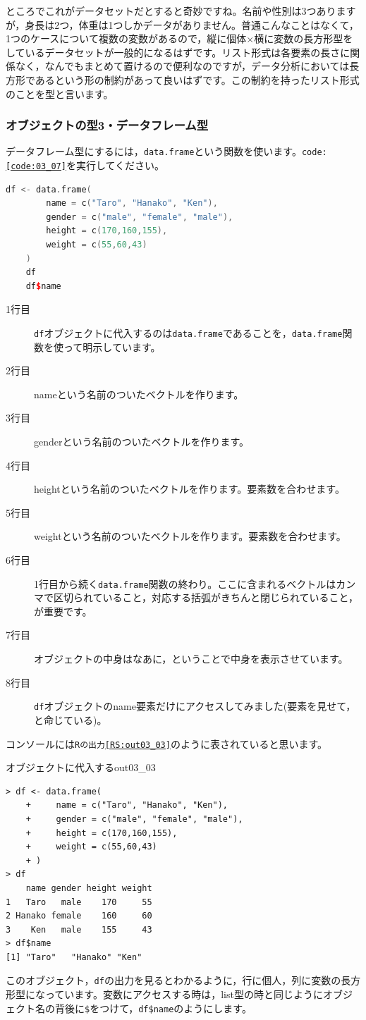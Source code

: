 \documentclass{ltjsbook}
\begin{document}
ところでこれがデータセットだとすると奇妙ですね。名前や性別は3つありますが，身長は2つ，体重は1つしかデータがありません。普通こんなことはなくて，1つのケースについて複数の変数があるので，縦に個体$\times$横に変数の長方形型をしているデータセットが一般的になるはずです。リスト形式は各要素の長さに関係なく，なんでもまとめて置けるので便利なのですが，データ分析においては長方形であるという形の制約があって良いはずです。この制約を持ったリスト形式のことを型と言います。
\subsubsection{オブジェクトの型3・データフレーム型}
データフレーム型にするには，\texttt{data.frame}という関数を使います。\texttt{code:\ref{code:03_07}}を実行してください。
\begin{lstlisting}[language=c++,label={code:03_07},caption={データフレーム型}]
	df <- data.frame(
		name = c("Taro", "Hanako", "Ken"),
		gender = c("male", "female", "male"),
		height = c(170,160,155),
		weight = c(55,60,43)
	)
	df
	df$name
\end{lstlisting}
\begin{description}
	\item[1行目] \texttt{df}オブジェクトに代入するのは\texttt{data.frame}であることを，\texttt{data.frame}関数を使って明示しています。
	\item[2行目] nameという名前のついたベクトルを作ります。
	\item[3行目] genderという名前のついたベクトルを作ります。
	\item[4行目] heightという名前のついたベクトルを作ります。要素数を合わせます。
	\item[5行目] weightという名前のついたベクトルを作ります。要素数を合わせます。
	\item[6行目] 1行目から続く\texttt{data.frame}関数の終わり。ここに含まれるベクトルはカンマで区切られていること，対応する括弧がきちんと閉じられていること，が重要です。
	\item[7行目] オブジェクトの中身はなあに，ということで中身を表示させています。
	\item[8行目] \texttt{df}オブジェクトのname要素だけにアクセスしてみました(要素を見せて，と命じている)。
\end{description}
コンソールには\texttt{Rの出力\ref{RS:out03_03}}のように表されていると思います。
\begin{Rscreen}{オブジェクトに代入する}{out03_03}
	\begin{verbatim}
> df <- data.frame(
	+     name = c("Taro", "Hanako", "Ken"),
	+     gender = c("male", "female", "male"),
	+     height = c(170,160,155),
	+     weight = c(55,60,43)
	+ )
> df
	name gender height weight
1   Taro   male    170     55
2 Hanako female    160     60
3    Ken   male    155     43
> df$name
[1] "Taro"   "Hanako" "Ken"
\end{verbatim}
\end{Rscreen}
このオブジェクト，\texttt{df}の出力を見るとわかるように，行に個人，列に変数の長方形型になっています。変数にアクセスする時は，list型の時と同じようにオブジェクト名の背後に\verb|$|をつけて，\verb|df$name|のようにします。
\end{document}
